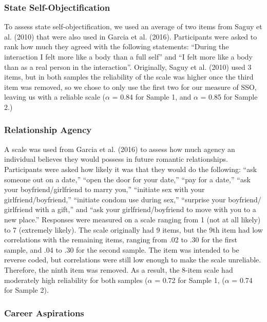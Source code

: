 \documentclass[man]{apa6}
\begin{document}
\subsubsection{State
Self-Objectification}\label{state-self-objectification}

To assess state self-objectification, we used an average of two items
from Saguy et al. (2010) that were also used in Garcia et al. (2016).
Participants were asked to rank how much they agreed with the following
statements: \enquote{During the interaction I felt more like a body than
a full self} and \enquote{I felt more like a body than as a real person
in the interaction}. Originally, Saguy et al. (2010) used 3 items, but
in both samples the reliability of the scale was higher once the third
item was removed, so we chose to only use the first two for our measure
of SSO, leaving us with a reliable scale (\(\alpha\) = 0.84 for Sample
1, and \(\alpha\) = 0.85 for Sample 2.)

\subsubsection{Relationship Agency}\label{relationship-agency}

A scale was used from Garcia et al. (2016) to assess how much agency an
individual believes they would possess in future romantic relationships.
Participants were asked how likely it was that they would do the
following: \enquote{ask someone out on a date,} \enquote{open the door
for your date,} \enquote{pay for a date,} \enquote{ask your
boyfriend/girlfriend to marry you,} \enquote{initiate sex with your
girlfriend/boyfriend,} \enquote{initiate condom use during sex,}
\enquote{surprise your boyfriend/ girlfriend with a gift,} and
\enquote{ask your girlfriend/boyfriend to move with you to a new place.}
Responses were measured on a scale ranging from 1 (not at all likely) to
7 (extremely likely). The scale originally had 9 items, but the 9th item
had low correlations with the remaining items, ranging from .02 to .30
for the first sample, and .04 to .30 for the second sample. The item was
intended to be reverse coded, but correlations were still low enough to
make the scale unreliable. Therefore, the ninth item was removed. As a
result, the 8-item scale had moderately high reliability for both
samples (\(\alpha\) = 0.72 for Sample 1, (\(\alpha\) = 0.74 for Sample
2).

\subsubsection{Career Aspirations}\label{career-aspirations}
\end{document}
